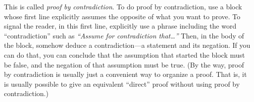 This is called \emph{proof by contradiction}.  To do proof
by contradiction, use a block whose first line explicitly assumes the opposite
of what you want to prove.  To signal the reader,
in this first line, explicitly use a phrase including the word ``contradiction'' such as 
\emph{``Assume for contradiction that\ldots''}
Then, in the body of the block, somehow deduce a contradiction---a statement and its negation.
If you can do that, you can conclude that the assumption that started the block must be false,
and the negation of that assumption must be true.
(By the way, proof by contradiction is usually just a convenient way to organize a proof.
That is, it is usually possible to give an equivalent ``direct'' proof without using proof by contradiction.)




